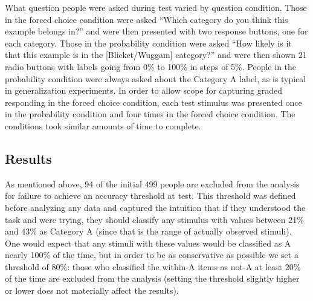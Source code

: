 \documentclass[doc,apacite]{apa6}
\begin{document}
What question people were asked during test varied by question condition. Those in the {\sc forced choice} condition were asked ``Which category do you think this example belongs in?'' and were then presented with two response buttons, one for each category. Those in the {\sc probability} condition were asked ``How likely is it that this example is in the [Blicket/Wuggam] category?'' and were then shown 21 radio buttons with labels going from 0\% to 100\% in steps of 5\%. People in the {\sc probability} condition were always asked about the Category A label, as is typical in generalization experiments. In order to allow scope for capturing graded responding in the {\sc forced choice} condition, each test stimulus was presented once in the {\sc probability} condition and four times in the {\sc forced choice} condition. The conditions took similar amounts of time to complete.



\subsection{Results}

As mentioned above, 94 of the initial 499 people are excluded from the analysis for failure to achieve an accuracy threshold at test. This threshold was defined before analyzing any data and captured the intuition that if they understood the task and were trying, they should classify any stimulus with values between 21\% and 43\% as Category A (since that is the range of actually observed stimuli). One would expect that any stimuli with these values would be classified as A nearly 100\% of the time, but in order to be as conservative as possible we set a threshold of 80\%: those who classified the within-A items as not-A at least 20\% of the time are excluded from the analysis (setting the threshold slightly higher or lower does not materially affect the results).
\end{document}

